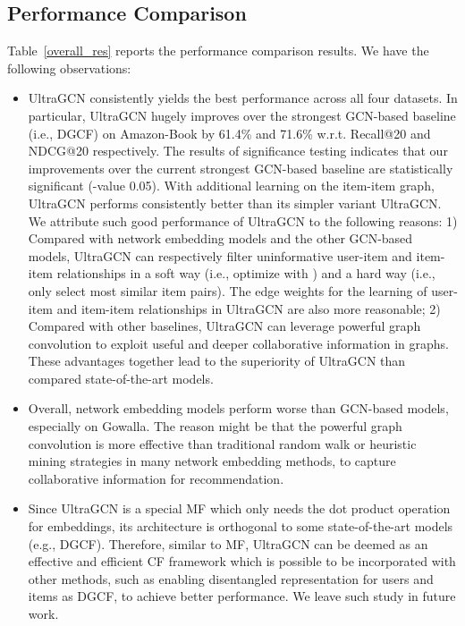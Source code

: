 \documentclass[sigconf,authorversion]{acmart}
\begin{document}
\subsection{Performance Comparison}
\label{performance_comparison}
Table~\ref{overall_res} reports the performance comparison results. We have the following observations:
\begin{itemize}





\item UltraGCN consistently yields the best performance across all four datasets. In particular, UltraGCN hugely improves over the strongest GCN-based baseline (i.e., DGCF) on Amazon-Book by 61.4\% and 71.6\% w.r.t. Recall@20 and NDCG@20 respectively.
The results of significance testing indicates that our improvements over the current strongest GCN-based baseline are statistically significant (-value  0.05). With additional learning on the item-item graph, UltraGCN performs consistently better than its simpler variant UltraGCN.
We attribute such good performance of UltraGCN to the following reasons:
1) Compared with
network embedding models and the other GCN-based models, UltraGCN can respectively filter uninformative user-item and item-item relationships in a soft way (i.e., optimize with ) and a hard way (i.e., only select  most similar item pairs).
The edge weights for the learning of user-item and item-item relationships in UltraGCN are also more reasonable;
2) Compared with other baselines, UltraGCN can leverage powerful graph convolution to exploit useful and deeper collaborative information in graphs. These advantages together lead to the superiority of UltraGCN than compared state-of-the-art models.

\item Overall, network embedding models perform worse than GCN-based models, especially on Gowalla. The reason might be that the powerful graph convolution is more effective than traditional random walk or heuristic mining strategies in many network embedding methods, to capture collaborative information for recommendation.

\item Since UltraGCN is a special MF which only needs the dot product operation for embeddings, its architecture is orthogonal to some state-of-the-art models (e.g., DGCF). Therefore, similar to MF, UltraGCN can be deemed as an effective and efficient CF framework which is possible to be incorporated with other methods, such as enabling disentangled representation for users and items as DGCF, to achieve better performance. We leave such study in future work.
\end{itemize}
\end{document}
